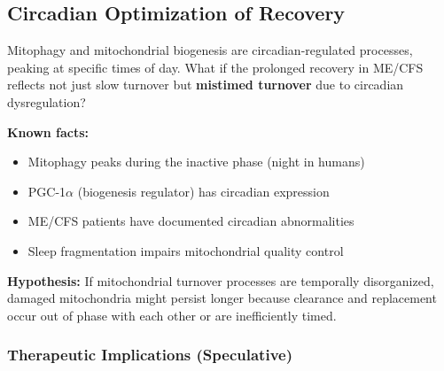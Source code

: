 \subsection{Circadian Optimization of Recovery}
\label{subsec:circadian-recovery}

\begin{open_question}
Mitophagy and mitochondrial biogenesis are circadian-regulated processes, peaking at specific times of day. What if the prolonged recovery in ME/CFS reflects not just slow turnover but \textbf{mistimed turnover} due to circadian dysregulation?

\textbf{Known facts:}
\begin{itemize}
    \item Mitophagy peaks during the inactive phase (night in humans)
    \item PGC-1$\alpha$ (biogenesis regulator) has circadian expression
    \item ME/CFS patients have documented circadian abnormalities
    \item Sleep fragmentation impairs mitochondrial quality control
\end{itemize}

\textbf{Hypothesis:} If mitochondrial turnover processes are temporally disorganized, damaged mitochondria might persist longer because clearance and replacement occur out of phase with each other or are inefficiently timed.
\end{open_question}

\subsubsection{Therapeutic Implications (Speculative)}

